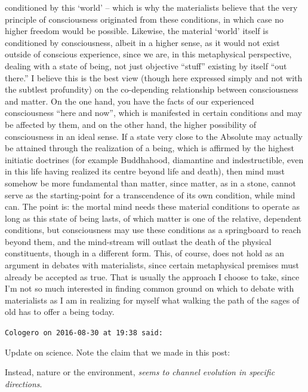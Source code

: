\begin{footnotesize}
\begin{sffamily}
conditioned by this `world’ – which is why the materialists believe that the very principle of
consciousness originated from these conditions, in which case no higher freedom would be possible. Likewise, the
material `world' itself is conditioned by consciousness, albeit in a higher sense, as it would
not exist outside of conscious experience, since we are, in this metaphysical perspective, dealing with a state of
being, not just objective “stuff” existing by itself “out there.” I believe this is the best view (though here
expressed simply and not with the subtlest profundity) on the co-depending relationship between consciousness and
matter. On the one hand, you have the facts of our experienced consciousness “here and now”, which is manifested in
certain conditions and may be affected by them, and on the other hand, the higher possibility of consciousness in an
ideal sense. If a state very close to the Absolute may actually be attained through the realization of a being, which
is affirmed by the highest initiatic doctrines (for example Buddhahood, diamantine and indestructible, even in this
life having realized its centre beyond life and death), then mind must somehow be more fundamental than matter, since
matter, as in a stone, cannot serve as the starting-point for a transcendence of its own condition, while mind can. The
point is: the mortal mind needs these material conditions to operate as long as this state of being lasts, of which
matter is one of the relative, dependent conditions, but consciousness may use these conditions as a springboard to
reach beyond them, and the mind-stream will outlast the death of the physical constituents, though in a different form.
This, of course, does not hold as an argument in debates with materialists, since certain metaphysical premises must
already be accepted as true. That is usually the approach I choose to take, since I'm not so much
interested in finding common ground on which to debate with materialists as I am in realizing for myself what walking
the path of the sages of old has to offer a being today.


\hfill

\texttt{Cologero on 2016-08-30 at 19:38 said: }

Update on science.\newline
Note the claim that we made in this post:

\begin{quotex}
Instead, nature or the environment, \emph{seems to channel evolution in specific directions}. 


\end{quotex}
\end{sffamily}
\end{footnotesize}
